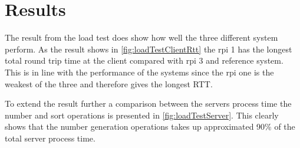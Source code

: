 \section{Results} \label{results}
The result from the load test does show how well the three different system perform. As the result shows in \cref{fig:loadTestClientRtt} the \acrshort{rpi} 1 has the longest total round trip time at the client compared with \acrshort{rpi} 3 and reference system. This is in line with the performance of the systems since the \acrshort{rpi} one is the weakest of the three and therefore gives the longest RTT. 



To extend the result further a comparison between the servers process time the number and sort operations is presented in \cref{fig:loadTestServer}. This clearly shows that the number generation operations takes up approximated 90\% of the total server process time.

